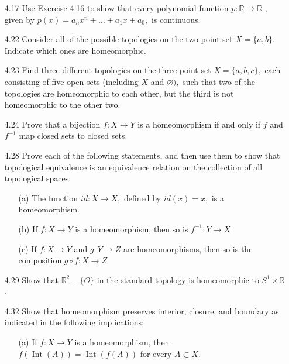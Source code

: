 \documentclass[12pt]{article}
\begin{document}
\begin{enumerate}
	\item[4.17] Use Exercise 4.16 to show that every polynomial function $p : \mathbb { R } \rightarrow \mathbb { R }$ , given by $p ( x ) = a _ { n } x ^ { n } + \ldots + a _ { 1 } x + a _ { 0 } ,$ is continuous.
	
	\item[4.22] Consider all of the possible topologies on the two-point set $X = \{ a , b \} .$ Indicate which ones are homeomorphic.
	
	\item[4.23] Find three different topologies on the three-point set $X = \{ a , b , c \} ,$ each consisting of five open sets (including $X$ and $\varnothing ) ,$ such that two of the topologies
	are homeomorphic to each other, but the third is not homeomorphic to the other two.
	
	\item[4.24] Prove that a bijection $f : X \rightarrow Y$ is a homeomorphism if and only if $f$ and $f ^ { - 1 }$ map closed sets to closed sets.
	
	\item[4.28] Prove each of the following statements, and then use them to show that topological equivalence is an equivalence relation on the collection of all topological spaces:
	\begin{enumerate}
		\item[(a)] The function $i d : X \rightarrow X ,$ defined by $i d ( x ) = x ,$ is a homeomorphism.
		
		\item[(b)] If $f : X \rightarrow Y$ is a homeomorphism, then so is $f ^ { - 1 } : Y \rightarrow X$
		
		\item[(c)] If $f : X \rightarrow Y$ and $g : Y \rightarrow Z$ are homeomorphisms, then so is the composition $g \circ f : X \rightarrow Z$
		
	\end{enumerate}
	
	\item[4.29] Show that $\mathbb { R } ^ { 2 } - \{ O \}$ in the standard topology is homeomorphic to $S ^ { 1 } \times \mathbb { R }$.
	
	\item[4.32] Show that homeomorphism preserves interior, closure, and boundary as indicated in the following implications:
	\begin{enumerate}
		\item[(a)] If $f : X \rightarrow Y$ is a homeomorphism, then $f ( \operatorname { Int } ( A ) ) = \operatorname { Int } ( f ( A ) )$ for every $A \subset X .$
		

\end{enumerate}
\end{enumerate}
\end{document}
